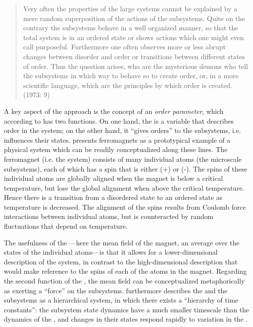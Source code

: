 \begin{quote}
    Very often the properties of the large systems cannot be explained by a mere random superposition of the actions of the subsystems. Quite on the contrary the subsystems behave in a well organized manner, so that the total system is in an ordered state or shows actions which one might even call purposeful. Furthermore one often observes more or less abrupt changes between disorder and order or transitions between different states of order. Thus the question arises, who are the mysterious demons who tell the subsystems in which way to behave so to create order, or, in a more scientific language, which are the principles by which order is created. (1973: 9)
\end{quote}

A key aspect of the  approach is the concept of an \textit{order parameter}, which according to  has two functions. On one hand, the  is a variable that describes order in the system; on the other hand, it “gives orders” \citep[10]{Haken1973} to the subsystems, i.e. influences their states.  presents ferromagnets as a prototypical example of a physical system which can be readily conceptualized along these lines. The ferromagnet (i.e. the  system) consists of many individual atoms (the microscale subsystems), each of which has a spin that is either (+) or (-). The spins of these individual atoms are globally aligned when the magnet is below a critical temperature, but lose the global alignment when above the critical temperature. Hence there is a transition from a disordered state to an ordered state as temperature is decreased. The alignment of the spins results from Coulomb force interactions between individual atoms, but is counteracted by random fluctuations that depend on temperature. 

The usefulness of the —here the mean field of the magnet, an average over the states of the individual atoms—is that it allows for a lower-dimensional description of the system, in contrast to the high-dimensional description that would make reference to the spins of each of the atoms in the magnet. Regarding the second function of the , the mean field can be conceptualized metaphorically as exerting a “force” on the subsystems.  furthermore describes the  and the subsystems as a hierarchical system, in which there exists a “hierarchy of time constants”: the subsystem state dynamics have a much smaller timescale than the dynamics of the , and changes in their states respond rapidly to variation in the . 

